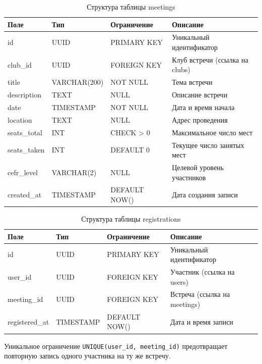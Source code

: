 \clearpage

\begin{table}[h]
\centering
\caption{Структура таблицы meetings}
\label{tab:meetings}
\begin{tabular}{|p{3cm}|p{3.5cm}|p{3.5cm}|p{3.5cm}|}
\hline
\textbf{Поле} & \textbf{Тип} & \textbf{Ограничение} & \textbf{Описание} \\
\hline
id & UUID & PRIMARY KEY & Уникальный идентификатор \\
\hline
club\_id & UUID & FOREIGN KEY & Клуб встречи (ссылка на clubs) \\
\hline
title & VARCHAR(200) & NOT NULL & Тема встречи \\
\hline
description & TEXT & NULL & Описание встречи \\
\hline
date & TIMESTAMP & NOT NULL & Дата и время начала \\
\hline
location & TEXT & NULL & Адрес проведения \\
\hline
seats\_total & INT & CHECK > 0 & Максимальное число мест \\
\hline
seats\_taken & INT & DEFAULT 0 & Текущее число занятых мест \\
\hline
cefr\_level & VARCHAR(2) & NULL & Целевой уровень участников \\
\hline
created\_at & TIMESTAMP & DEFAULT NOW() & Дата создания записи \\
\hline
\end{tabular}
\end{table}

\begin{table}[h]
\centering
\caption{Структура таблицы registrations}
\label{tab:registrations}
\begin{tabular}{|p{3cm}|p{3.5cm}|p{3.5cm}|p{3.5cm}|}
\hline
\textbf{Поле} & \textbf{Тип} & \textbf{Ограничение} & \textbf{Описание} \\
\hline
id & UUID & PRIMARY KEY & Уникальный идентификатор \\
\hline
user\_id & UUID & FOREIGN KEY & Участник (ссылка на users) \\
\hline
meeting\_id & UUID & FOREIGN KEY & Встреча (ссылка на meetings) \\
\hline
registered\_at & TIMESTAMP & DEFAULT NOW() & Дата и время записи \\
\hline
\end{tabular}
\end{table}

Уникальное ограничение \texttt{UNIQUE(user\_id, meeting\_id)} предотвращает
повторную запись одного участника на ту же встречу.

